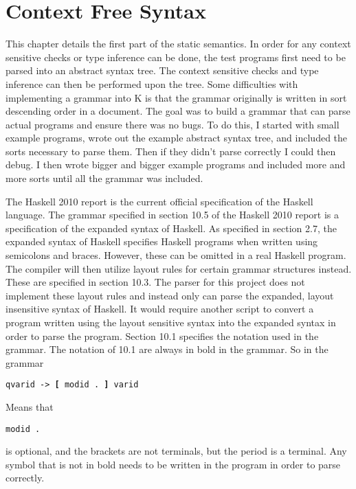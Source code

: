 \chapter{Context Free Syntax}
This chapter details the first part of the static semantics. In order for any context sensitive checks or type inference can be done, the test programs first need to be parsed into an abstract syntax tree. The context sensitive checks and type inference can then be performed upon the tree.
Some difficulties with implementing a grammar into K is that the grammar originally is written in sort descending order in a document. The goal was to build a grammar that can parse actual programs and ensure there was no bugs. To do this, I started with small example programs, wrote out the example abstract syntax tree, and included the sorts necessary to parse them. Then if they didn't parse correctly I could then debug. I then wrote bigger and bigger example programs and included more and more sorts until all the grammar was included.

The Haskell 2010 report is the current official specification of the Haskell language. %
The grammar specified in section 10.5 of the Haskell 2010 report is a specification of the expanded syntax of Haskell.
As specified in section 2.7, the expanded syntax of Haskell specifies Haskell programs when written using semicolons and braces. However, these can be omitted in a real Haskell program. The compiler will then utilize layout rules for certain grammar structures instead. These are specified in section 10.3.
The parser for this project does not implement these layout rules and instead only can parse the expanded, layout insensitive syntax of Haskell. It would require another script to convert a program written using the layout sensitive syntax into the expanded syntax in order to parse the program.
Section 10.1 specifies the notation used in the grammar.
The notation of 10.1 are always in bold in the grammar.
So in the grammar

\texttt{qvarid -> \textbf{[} modid . \textbf{]} varid}

Means that 
\begin{lstlisting}
modid .
\end{lstlisting}
is optional, and the brackets are not terminals, but the period is a terminal. Any symbol that is not in bold needs to be written in the program in order to parse correctly.


